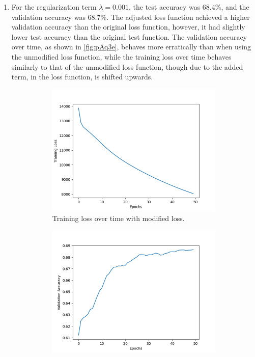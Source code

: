 \documentclass[10pt]{article}
\begin{document}
\begin{enumerate}
\begin{enumerate}[label = \textbf{\alph*}.]
        \item For the regularization term $\lambda = 0.001$, the 
        test accuracy was 68.4\%, 
        and the validation accuracy was 68.7\%.
        The adjusted loss function achieved a higher validation accuracy than the original loss function, 
        however, it had slightly lower test accuracy than the original test function. 
        The validation accuracy over time, as shown in \ref{fig:pAq3e}, behaves more erratically
        than when using the unmodified loss function, while the training loss over time behaves similarly to that of the unmodified loss function, though due to the added term, in the loss function, is shifted upwards.
        
        
        \begin{figure}[h!]
            \centering
            \begin{subfigure}[h!]{.46\textwidth}
                \centering
                \includegraphics[width=.95\linewidth]{final/part_a_q3e1.png}
                \caption{Training loss over time with modified loss.}
            \end{subfigure}
            \quad
            \begin{subfigure}[h!]{.46\textwidth}
                \centering
                \includegraphics[width=.95\linewidth]{final/part_a_q3e2.png}

\end{subfigure}
\end{figure}
\end{enumerate}
\end{enumerate}
\end{document}
